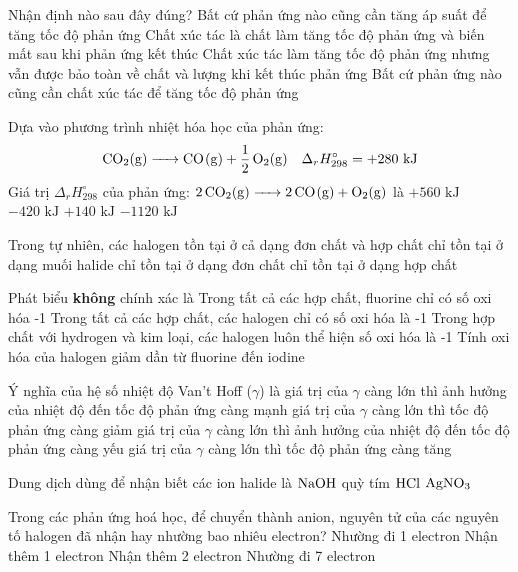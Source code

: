 \documentclass[12pt,a4paper]{article}
\begin{document}
\begin{ex}
Nhận định nào sau đây đúng?
\choice
{Bất cứ phản ứng nào cũng cần tăng áp suất để tăng tốc độ phản ứng}
{Chất xúc tác là chất làm tăng tốc độ phản ứng và biến mất sau khi phản ứng kết thúc}
{Chất xúc tác làm tăng tốc độ phản ứng nhưng vẫn được bảo toàn về chất và lượng khi kết thúc phản ứng}
{Bất cứ phản ứng nào cũng cần chất xúc tác để tăng tốc độ phản ứng}
\end{ex}

\begin{ex}
Dựa vào phương trình nhiệt hóa học của phản ứng:
\[\ce{CO2(g) -> CO(g) + 1/2 O2(g)} \quad \Delta_r H^\circ_{298} = +280\text{ kJ}\]
Giá trị $\Delta_r H^\circ_{298}$ của phản ứng: $\ce{2CO2(g) -> 2CO(g) + O2(g)}$ là
\choice
{$+560\text{ kJ}$}
{$-420\text{ kJ}$}
{$+140\text{ kJ}$}
{$-1120\text{ kJ}$}
\end{ex}

\begin{ex}
Trong tự nhiên, các halogen
\choice
{tồn tại ở cả dạng đơn chất và hợp chất}
{chỉ tồn tại ở dạng muối halide}
{chỉ tồn tại ở dạng đơn chất}
{chỉ tồn tại ở dạng hợp chất}
\end{ex}

\begin{ex}
Phát biểu \textbf{không} chính xác là
\choice
{Trong tất cả các hợp chất, fluorine chỉ có số oxi hóa -1}
{Trong tất cả các hợp chất, các halogen chỉ có số oxi hóa là -1}
{Trong hợp chất với hydrogen và kim loại, các halogen luôn thể hiện số oxi hóa là -1}
{Tính oxi hóa của halogen giảm dần từ fluorine đến iodine}
\end{ex}

\begin{ex}
Ý nghĩa của hệ số nhiệt độ Van't Hoff ($\gamma$) là
\choice
{giá trị của $\gamma$ càng lớn thì ảnh hưởng của nhiệt độ đến tốc độ phản ứng càng mạnh}
{giá trị của $\gamma$ càng lớn thì tốc độ phản ứng càng giảm}
{giá trị của $\gamma$ càng lớn thì ảnh hưởng của nhiệt độ đến tốc độ phản ứng càng yếu}
{giá trị của $\gamma$ càng lớn thì tốc độ phản ứng càng tăng}
\end{ex}

\begin{ex}
Dung dịch dùng để nhận biết các ion halide là
\choice
{$\ce{NaOH}$}
{quỳ tím}
{$\ce{HCl}$}
{$\ce{AgNO3}$}
\end{ex}

\begin{ex}
Trong các phản ứng hoá học, để chuyển thành anion, nguyên tử của các nguyên tố halogen đã nhận hay nhường bao nhiêu electron?
\choice
{Nhường đi 1 electron}
{Nhận thêm 1 electron}
{Nhận thêm 2 electron}
{Nhường đi 7 electron}
\end{ex}
\end{document}
